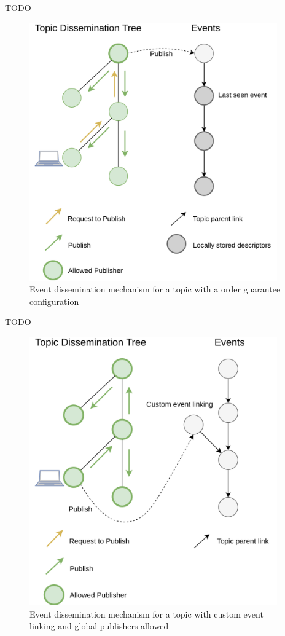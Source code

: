 TODO

\begin{figure}[hb!]
  \centering
  \includegraphics[width=0.95\textwidth]{img/pulsarcast-publish-order-guarantee.png}
  \caption{Event dissemination mechanism for a topic with a order guarantee configuration}
  \label{fig:pulsarcast-publish-order-guarantee}
\end{figure}

TODO

\begin{figure}[hb!]
  \centering
  \includegraphics[width=0.95\textwidth]{img/pulsarcast-publish-custom.png}
  \caption{Event dissemination mechanism for a topic with custom event linking and global publishers allowed}
  \label{fig:pulsarcast-publish-custom}
\end{figure}

